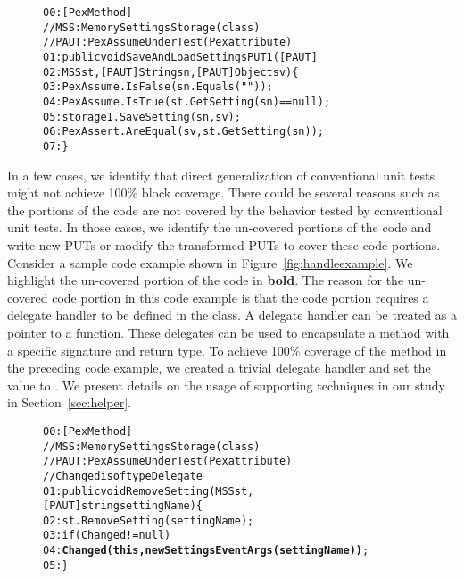 \begin{figure}[t]
\begin{CodeOut}
\begin{alltt}
00:[PexMethod]
\hspace*{0.3in}//MSS: MemorySettingsStorage (class)
\hspace*{0.3in}//PAUT: PexAssumeUnderTest	(Pex attribute)
01:public void SaveAndLoadSettingsPUT1([PAUT]
02:\hspace*{0.1in}MSS st, [PAUT]String sn, [PAUT]Object sv) \{
03:\hspace*{0.2in}PexAssume.IsFalse(sn.Equals(""));
04:\hspace*{0.2in}PexAssume.IsTrue(st.GetSetting(sn) == null);
05:\hspace*{0.2in}storage1.SaveSetting(sn, sv);
06:\hspace*{0.2in}PexAssert.AreEqual(sv, st.GetSetting(sn));
07:\}
\end{alltt}
\end{CodeOut}
\end{figure}

In a few cases, we identify that direct generalization of conventional unit tests might not
achieve 100\% block coverage. There could be several reasons such as the portions of 
the code are not covered by the behavior tested by conventional unit tests. In those cases, we identify
the un-covered portions of the code and write new PUTs or modify the transformed PUTs to cover these code portions. Consider a sample code example shown in Figure~\ref{fig:handleexample}. We highlight 
the un-covered portion of the code in \textbf{bold}. The reason for the un-covered code portion in this code example is that the code portion requires a delegate handler to be defined in the class. A delegate
handler can be treated as a pointer to a function. These delegates can be used
to encapsulate a method with a specific signature and return type. To achieve
100\% coverage of the  method in the preceding code example,
we created a trivial delegate handler and set the value to .
We present details on the usage of supporting techniques in our study in Section~\ref{sec:helper}.

\begin{figure}[t]
\begin{CodeOut}
\begin{alltt}
00:[PexMethod]
//MSS: MemorySettingsStorage (class)
//PAUT: PexAssumeUnderTest	(Pex attribute)
//Changed is of type Delegate
01:public void RemoveSetting(MSS st,
\hspace*{0.3in}[PAUT]string settingName) \{
02:\hspace*{0.1in}st.RemoveSetting( settingName );
03:\hspace*{0.1in}if (Changed != null)
04:\hspace*{0.2in}\textbf{Changed(this, new SettingsEventArgs(settingName))};
05:\}
\end{alltt}
\end{CodeOut}
\end{figure}

